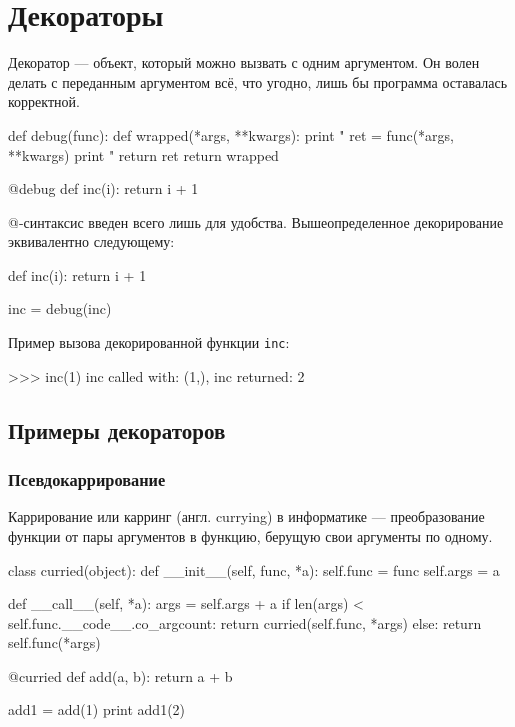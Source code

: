 \section{Декораторы}
\label{sec:py-decorators}
Декоратор --- объект, который можно вызвать с одним аргументом. Он волен делать с переданным аргументом всё, что угодно, лишь бы программа оставалась корректной.
\begin{pylst}{}{}
def debug(func):
    def wrapped(*args, **kwargs):
        print "%
        ret = func(*args, **kwargs)
        print "%
        return ret
    return wrapped

@debug
def inc(i):
    return i + 1
\end{pylst}

@-синтаксис введен всего лишь для удобства. Вышеопределенное декорирование эквивалентно следующему:
\begin{pylst}{}{}
def inc(i):
    return i + 1

inc = debug(inc)
\end{pylst}

Пример вызова декорированной функции \lstinline{inc}:
\begin{pylst}{}{}
>>> inc(1)
inc called with: (1,), {}
inc returned: 2
\end{pylst}

\subsection{Примеры декораторов}
\subsubsection{Псевдокаррирование}
Каррирование или карринг (англ. currying) в информатике --- преобразование функции от пары аргументов в функцию, берущую свои аргументы по одному.
\begin{pylst}{}{}
class curried(object):
    def __init__(self, func, *a):
        self.func = func
        self.args = a

    def __call__(self, *a):
        args = self.args + a
        if len(args) < self.func.__code__.co_argcount:
            return curried(self.func, *args)
        else:
            return self.func(*args)

@curried
def add(a, b):
    return a + b

add1 = add(1)
print add1(2)
\end{pylst}

